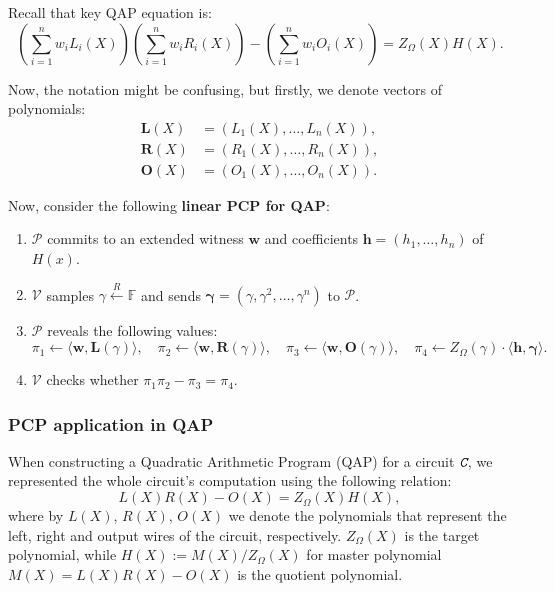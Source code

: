\documentclass[../lecture-notes.tex]{subfiles}
\begin{document}
\begin{example}
    Recall that key QAP equation is:
    \begin{equation*}
        \left(\sum_{i=1}^nw_iL_i(X)\right)\left(\sum_{i=1}^nw_iR_i(X)\right) - \left(\sum_{i=1}^nw_iO_i(X)\right) = Z_{\Omega}(X)H(X).
    \end{equation*}

    Now, the notation might be confusing, but firstly, we denote vectors of polynomials: 
    \begin{align*}
        \boldsymbol{L}(X) & = (L_1(X),\dots,L_n(X)), \\
        \boldsymbol{R}(X) & = (R_1(X),\dots,R_n(X)), \\
        \boldsymbol{O}(X) & = (O_1(X),\dots,O_n(X)).
    \end{align*}
    
    Now, consider the following \textbf{linear PCP for QAP}:
    \begin{enumerate}
        \item $\mathcal{P}$ commits to an extended witness $\mathbf{w}$ and coefficients $\mathbf{h} = (h_1,\dots,h_n)$ of $H(x)$.
        \item $\mathcal{V}$ samples $\gamma \xleftarrow{R} \mathbb{F}$ and sends $\boldsymbol{\gamma} = (\gamma,\gamma^2,\dots,\gamma^n)$ to $\mathcal{P}$.
        \item $\mathcal{P}$ reveals the following values:
        \begin{equation*}
            \pi_1 \gets \langle \mathbf{w}, \boldsymbol{L}(\gamma) \rangle, \quad \pi_2 \gets \langle \mathbf{w}, \boldsymbol{R}(\gamma) \rangle, \quad \pi_3 \gets \langle \mathbf{w}, \boldsymbol{O}(\gamma) \rangle, \quad \pi_4 \gets Z_{\Omega}(\gamma) \cdot \langle \mathbf{h}, \boldsymbol{\gamma} \rangle.
        \end{equation*}
        \item $\mathcal{V}$ checks whether $\pi_1\pi_2 - \pi_3 = \pi_4$.
    \end{enumerate}
\end{example}

\subsubsection{PCP application in QAP}

When constructing a Quadratic Arithmetic Program (QAP) for a circuit $\textit{\texttt{C}}$, we represented the whole circuit's 
computation using the following relation:
\begin{equation*}
    L(X)R(X) - O(X) = Z_{\Omega}(X)H(X),
\end{equation*}
where by $L(X)$, $R(X)$, $O(X)$ we denote the polynomials that represent the left, right and output 
wires of the circuit, respectively. $Z_{\Omega}(X)$ is the target polynomial, while
$H(X) := M(X)\big/Z_{\Omega}(X)$ for master polynomial $M(X) = L(X)R(X) - O(X)$ is the quotient polynomial.
\end{document}
